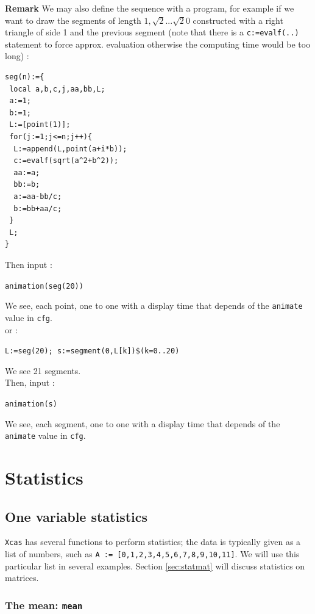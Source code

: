 \documentclass[a4paper,11pt]{book}
\begin{document}
{\bf Remark}
We may also define the sequence with a program, 
for example if we want to draw the
segments of length $1,\sqrt 2...\sqrt 20$ constructed with a 
right triangle of side 1 and the previous segment
(note that there is a {\tt c:=evalf(..)} statement
to force approx. evaluation otherwise the computing time 
would be too long) :
\begin{verbatim}
seg(n):={
 local a,b,c,j,aa,bb,L;
 a:=1;
 b:=1;
 L:=[point(1)];
 for(j:=1;j<=n;j++){
  L:=append(L,point(a+i*b));
  c:=evalf(sqrt(a^2+b^2));
  aa:=a;
  bb:=b;
  a:=aa-bb/c;
  b:=bb+aa/c;
 }
 L;
}
\end{verbatim}
Then input : 
\begin{center}{\tt animation(seg(20))}\end{center}
We see, each point, one to one with a display time that
depends of the {\tt animate} value in {\tt cfg}.\\
or :
\begin{center}{\tt L:=seg(20); s:=segment(0,L[k])\$(k=0..20)}\end{center}
We see 21 segments. \\
Then, input :
\begin{center}{\tt animation(s)}\end{center}
We see, each segment, one to one with a display time that
depends of the {\tt animate} value in {\tt cfg}.

\chapter{Statistics}\label{sec:stat}

\section{One variable statistics}

\texttt{Xcas} has several functions to perform statistics; the data is
typically given as a list of numbers, such as \texttt{A :=
[0,1,2,3,4,5,6,7,8,9,10,11]}.  We will use this particular list in
several examples. Section \ref{sec:statmat} will discuss statistics on
matrices.

\subsection{The mean: \texttt{mean}}
\end{document}
